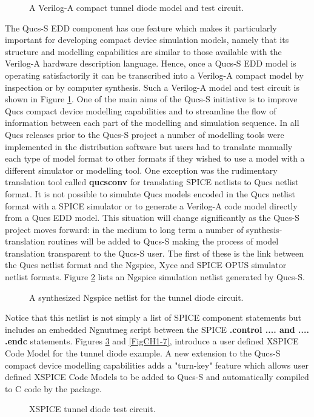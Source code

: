 \begin{figure}[h]
	\centering
	\caption{A Verilog-A compact tunnel diode model and test circuit. }
	\label{FigCH1-4}
\end{figure}
\noindent The Qucs-S EDD component has one feature which makes it particularly important for developing compact device simulation  models, namely that its structure and modelling capabilities are similar to those available with the Verilog-A hardware description language.  Hence, once a Qucs-S EDD model is operating satisfactorily it can be transcribed into a Verilog-A compact model by inspection or by computer synthesis.  Such a Verilog-A model and test circuit is shown in Figure \ref{FigCH1-4}.
One of the main aims of the Qucs-S initiative is to improve Qucs compact device modelling capabilities and to streamline the flow of information between each part of the modelling and simulation sequence. In all Qucs releases prior to the Qucs-S project a number of modelling tools were implemented in the distribution software but users had to translate manually each type of model format to other formats if they wished to use a model with a different simulator or modelling tool. One exception was the rudimentary translation tool called \textbf{qucsconv} for translating SPICE netlists to Qucs netlist format. It is not possible to simulate Qucs models encoded in the Qucs netlist format with a SPICE simulator or to generate a Verilog-A code model directly from a Qucs EDD model. This situation will change significantly as the Qucs-S project moves forward: in the medium to long term a number of synthesis-translation routines will be added to Qucs-S making the process of model translation transparent to the Qucs-S user.  The first of these is the link between the Qucs netlist format and the Ngspice, Xyce and SPICE OPUS simulator netlist formats. Figure \ref{FigCH1-5} lists an Ngspice simulation netlist generated by Qucs-S.
\begin{figure}[h]
	\centering
	\caption{A synthesized Ngspice netlist for the tunnel diode circuit.}
	\label{FigCH1-5}
\end{figure}
Notice that this netlist is not simply a list of SPICE component statements but includes an embedded Ngnutmeg script between the SPICE \textbf{.control .... and .... .endc} statements.
Figures \ref{FigCH1-6} and \ref{FigCH1-7}, introduce a user defined XSPICE Code Model for the tunnel diode example. A new extension to the Qucs-S compact device modelling capabilities adds a "turn-key" feature which allows user defined XSPICE Code Models to be added to Qucs-S and automatically compiled to C code by the package.
\begin{figure}[h]
	\centering
	\caption{XSPICE tunnel diode test circuit.}
	\label{FigCH1-6}
\end{figure}
